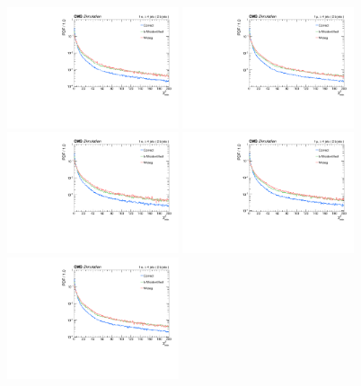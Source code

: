 \begin{figure}[p]
    \centering
    \includegraphics[width=0.45\textwidth]{figure/bbSep_16_el_Rate_PDF_bbSep.pdf}
    \includegraphics[width=0.45\textwidth]{figure/bbSep_16_mu_Rate_PDF_bbSep.pdf}
    \includegraphics[width=0.45\textwidth]{figure/bbSep_17_el_Rate_PDF_bbSep.pdf}
    \includegraphics[width=0.45\textwidth]{figure/bbSep_17_mu_Rate_PDF_bbSep.pdf}
    \includegraphics[width=0.45\textwidth]{figure/bbSep_18_el_Rate_PDF_bbSep.pdf}

\end{figure}
